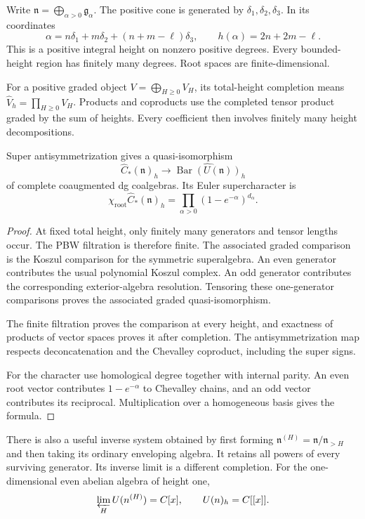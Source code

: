 Write \(\mathfrak n=\bigoplus_{\alpha>0}\mathfrak g_\alpha\).
The positive cone is generated by \(\delta_1,\delta_2,\delta_3\).
In its coordinates
\[
 \alpha=n\delta_1+m\delta_2+(n+m-\ell)\delta_3,\qquad
 h(\alpha)=2n+2m-\ell.
\]
This is a positive integral height on nonzero positive degrees.
Every bounded-height region has finitely many degrees.
Root spaces are finite-dimensional.

For a positive graded object \(V=\bigoplus_{H\geq0}V_H\), its
total-height completion means
\(\widehat V_h=\prod_{H\geq0}V_H\).
Products and coproducts use the completed tensor product graded
by the sum of heights. Every coefficient then involves finitely
many height decompositions.

\begin{proposition}\label{mht:prop:compact-bar}
Super antisymmetrization gives a quasi-isomorphism
\[
 \widehat C_*(\mathfrak n)_h
     \longrightarrow
 \widehat{\operatorname{Bar}(U(\mathfrak n))}_h
\]
of complete coaugmented dg coalgebras.
Its Euler supercharacter is
\[
 \chi_{\mathrm{root}}\widehat C_*(\mathfrak n)_h
        =\prod_{\alpha>0}(1-e^{-\alpha})^{d_\alpha}.
\]
\end{proposition}
\begin{proof}
At fixed total height, only finitely many generators and tensor
lengths occur. The PBW filtration is therefore finite.
The associated graded comparison is the Koszul comparison for
the symmetric superalgebra. An even generator contributes the
usual polynomial Koszul complex. An odd generator contributes
the corresponding exterior-algebra resolution.
Tensoring these one-generator comparisons proves the associated
graded quasi-isomorphism.

The finite filtration proves the
comparison at every height, and exactness of products of vector
spaces proves it after completion.
The antisymmetrization map respects deconcatenation and the
Chevalley coproduct, including the super signs.

For the character use homological degree together with internal
parity. An even root vector contributes \(1-e^{-\alpha}\) to
Chevalley chains, and an odd vector contributes its reciprocal.
Multiplication over a homogeneous basis gives the formula.
\end{proof}

There is also a useful inverse system obtained by first forming
\(\mathfrak n^{(H)}=\mathfrak n/\mathfrak n_{>H}\) and then taking
its ordinary enveloping algebra. It retains all powers of every
surviving generator. Its inverse limit is a different completion.
For the one-dimensional even abelian algebra of height one,
\[
 \varprojlim_HU(\mathfrak n^{(H)})=\mathbb C[x],
 \qquad \widehat{U(\mathfrak n)}_h=\mathbb C[[x]].
\]

